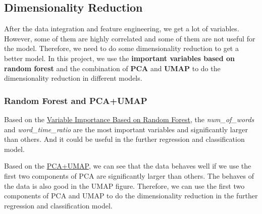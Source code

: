 \documentclass[8pt]{report}
\begin{document}

\subsection{Dimensionality Reduction}
After the data integration and feature engineering, we get a lot of variables.
However, some of them are highly correlated and some of them are not useful for the model.
Therefore, we need to do some dimensionality reduction to get a better model.
In this project, we use the \textbf{important variables based on random forest} and the combination of \textbf{PCA} and \textbf{UMAP} to do the dimensionality reduction in different models.

\subsubsection{Random Forest and PCA+UMAP}
Based on the \hyperref[fig:RF_PCA_and_UMAP]{Variable Importance Based on Random Forest}, the \textit{num\_of\_words} and \textit{word\_time\_ratio} are the most important variables and significantly larger than others. 
And it could be useful in the further regression and classification model. 

Based on the \hyperref[fig:RF_PCA_and_UMAP]{PCA+UMAP}, we can see that the data behaves well if we use the first two components of PCA are significantly larger than others. The behaves of the data is also good in the UMAP figure. Therefore, we can use the first two components of PCA and UMAP to do the dimensionality reduction in the further regression and classification model.
\end{document}
